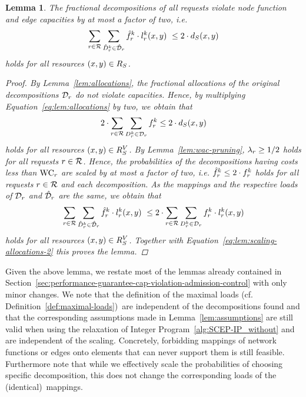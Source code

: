 \documentclass[10pt, conference, letterpaper]{IEEEtran}
\newtheorem{lemma}[theorem]{Lemma}
\begin{document}
\begin{lemma}
\label{lem:relation-of-loads-to-capacities-without-admission}
The fractional decompositions of all requests violate node function and edge capacities by at most a factor of two, i.e. 
\begin{alignat}{3}
\sum_{\req \in \requests} \sum_{\decompHat \in \PotEmbeddingsHat} \probHat \cdot \load(x,y)~\leq 2\cdot \Scap(x,y)
\label{eq:lem:scaling-allocations}
\end{alignat}
holds for all resources $(x,y) \in  R_{S}$.
\begin{proof}
By Lemma~\ref{lem:allocations}, the fractional allocations of the original decompositions $\PotEmbeddings$ do not violate capacities. Hence, by multiplying Equation~\ref{eq:lem:allocations} by two, we obtain that 
\begin{align}
2\cdot \sum_{r \in \mathcal{R}} \sum_{D^k_{r} \in \mathcal{D}_r} f^k_r \leq 2\cdot d_{S}(x,y)
\label{eq:lem:scaling-allocations-2}
\end{align}
holds for all resources $(x,y) \in  R^V_{S}$. By Lemma~\ref{lem:wac-pruning}, $\lambda_{r} \geq 1/2$ holds for all requests $r \in \mathcal{R}$. Hence, the probabilities of the decompositions having costs less than $\WAC$ are scaled by at most a factor of two, i.e. $\probHat \leq 2\cdot \prob$ holds for all requests $r \in \mathcal{R}$ and each decomposition. As the mappings and the respective loads of $\PotEmbeddings$ and $\PotEmbeddingsHat$ are the same, we  obtain that
\begin{align*}
\sum_{\req \in \requests} \sum_{\decompHat \in \PotEmbeddingsHat} \probHat \cdot \load(x,y)~\leq 2\cdot \sum_{\req \in \requests} \sum_{\decomp \in \PotEmbeddings} \prob \cdot \load(x,y)
\end{align*} 
holds for all resources $(x,y) \in  R^V_{S}$. Together with Equation~\ref{eq:lem:scaling-allocations-2} this proves the lemma.
\end{proof}
\end{lemma}

Given the above lemma, we restate most of the lemmas already contained in Section~\ref{sec:performance-guarantee-cap-violation-admission-control} with only minor changes. We note that the definition of the maximal loads (cf. Definition~\ref{def:maximal-loads})~are independent of the decompositions found and that the corresponding assumptions made in Lemma~\ref{lem:assumptions} are still valid when using the relaxation of Integer Program~\ref{alg:SCEP-IP_without} and are independent of the scaling. Concretely, forbidding mappings of network functions or edges onto elements that can never support them is still feasible. Furthermore note that while we effectively scale the probabilities of choosing specific decomposition, this does not change the corresponding loads of the (identical)~mappings. 
\end{document}
